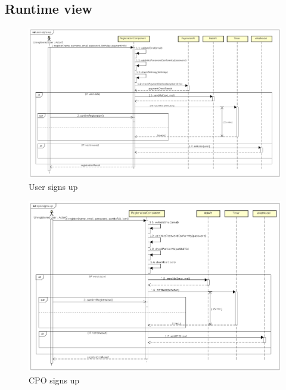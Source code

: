\subsection{Runtime view}
\begin{figure}[!h]
    \begin{center}
        \includegraphics[keepaspectratio, width=16cm]{Sequence/user-signs-up.png}
        \caption{User signs up}
        \label{fig:user-signs-up}
    \end{center}
\end{figure}
\begin{figure}[!h]
    \begin{center}
        \includegraphics[keepaspectratio, width=16cm]{Sequence/cpo-signs-up.png}
        \caption{\ac{CPO} signs up}
        \label{fig:cpo-signs-up}
    \end{center}
\end{figure}
